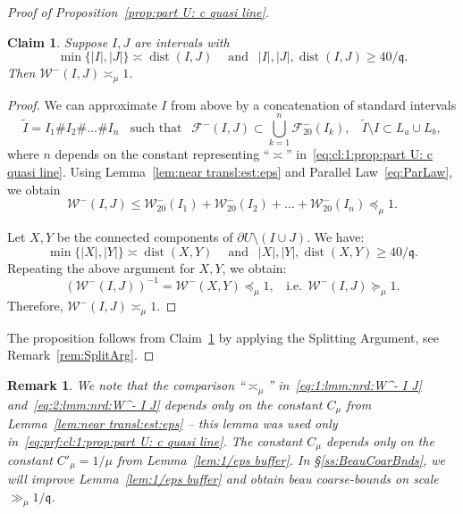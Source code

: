 \documentclass{amsart}
\renewcommand{\sp}{{\ \ }}
\newcommand{\1}{{\mathbb 1 }}
\newcommand{\Fam}{{\mathcal F}}
\newcommand{\Width}{{\mathcal W}}
\newcommand{\epscasc}{{\mu}}
\newcommand{\qq}{\mathfrak{q}}
\newtheorem{claim3}{Claim}
\newtheorem{rem}[thm]{Remark}
\theoremstyle{remark}
\numberwithin{equation}{section}
\theoremstyle{definition}
\newcommand{\dist}{\operatorname{dist}}
\begin{document}
\begin{proof}[Proof of Proposition~\ref{prop:part U: c quasi line}]

\begin{claim3}
\label{cl:1:prop:part U: c quasi line}
Suppose $I,J$ are intervals with 
\begin{equation}
\label{eq:cl:1:prop:part U: c quasi line}
 \min \{|I| , |J| \} \asymp \dist(I,J) \sp\sp \text{ and } \sp |I|, |J|, \dist(I,J) \ge 40/\qq.
\end{equation}
Then $\Width^-(I,J)  \asymp_\epscasc 1$.
\end{claim3}
\begin{proof}
We can approximate $I$ from above by a concatenation of standard intervals \[\widetilde I=I_1\#I_2\#\dots \# I_n\sp\sp \text{such that }\sp \Fam^-(I,J)\subset \bigcup_{k=1}^n \Fam^-_{20}(I_k),\sp\sp \widetilde I\setminus I\subset L_a\cup L_b,\] where $n$ depends on the constant representing ``$\asymp$'' in~\eqref{eq:cl:1:prop:part U: c quasi line}. 
Using Lemma~\ref{lem:near transl:est:eps} and Parallel Law~\eqref{eq:ParLaw}, we obtain
\begin{equation}
\label{eq:prf:cl:1:prop:part U: c quasi line}
\Width^-(I,J)\le \Width_{20}^-(I_1)+\Width_{20}^-(I_2)+\dots + \Width_{20}^-(I_n)\preceq_{\epscasc} 1.
\end{equation}

Let $X, Y$ be the connected components of $\partial U\setminus (I\cup J)$. We have:
\[ \min \{|X| , |Y| \} \asymp \dist(X,Y) \sp\sp \text{ and } \sp |X|, |Y|, \dist(X,Y) \ge 40/\qq.
\] 
Repeating the above argument for $X, Y$, we obtain:
\[\left(\Width^-(I,J)\right)^{-1}=\Width^-(X,Y) \preceq_{\epscasc} 1,\sp\sp \text{i.e.}\sp \Width^-(I,J) \succeq_{\epscasc}1.\]
Therefore, $\Width^-(I,J)\asymp_\epscasc 1$.
\end{proof}


The proposition follows from Claim~\ref{cl:1:prop:part U: c quasi line} by applying the Splitting Argument, see Remark~\ref{rem:SplitArg}.
\end{proof}

\begin{rem}
\label{rem:prop:part U: c quasi line}
We note that the comparison ``$\asymp_\epscasc$''  in~\eqref{eq:1:lmm:nrd:W^- I J} and~\eqref{eq:2:lmm:nrd:W^- I J} depends only on the constant $C_\epscasc$ from Lemma~\ref{lem:near transl:est:eps} -- this lemma was used only in~\eqref{eq:prf:cl:1:prop:part U: c quasi line}. The constant $C_\epscasc$ depends only on the constant $C'_\epscasc=1/\epscasc$ from Lemma~\ref{lem:1/eps buffer}. In \S\ref{ss:BeauCoarBnds}, we will improve Lemma~\ref{lem:1/eps buffer} and obtain beau coarse-bounds on scale $\gg_\epscasc 1/\qq $.
\end{rem}
\end{document}
